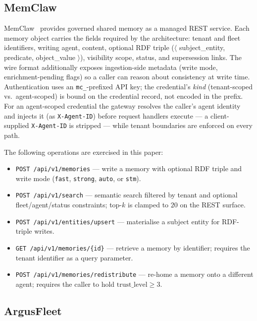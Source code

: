 \documentclass[10pt,twocolumn,letterpaper]{article}
\begin{document}
\subsection{MemClaw}

MemClaw~\citep{memclaw} provides governed shared memory as a managed REST service. Each memory object carries the fields required by the architecture: tenant and fleet identifiers, writing agent, content, optional RDF triple (\(\langle\) subject\_entity, predicate, object\_value \(\rangle\)), visibility scope, status, and supersession links. The wire format additionally exposes ingestion-side metadata (write mode, enrichment-pending flags) so a caller can reason about consistency at write time. Authentication uses an \texttt{mc\_}-prefixed API key; the credential's \emph{kind} (tenant-scoped vs.\ agent-scoped) is bound on the credential record, not encoded in the prefix. For an agent-scoped credential the gateway resolves the caller's agent identity and injects it (as \texttt{X-Agent-ID}) before request handlers execute --- a client-supplied \texttt{X-Agent-ID} is stripped --- while tenant boundaries are enforced on every path.

The following operations are exercised in this paper:
\begin{itemize}
    \item \texttt{POST /api/v1/memories} --- write a memory with optional RDF triple and write mode (\texttt{fast}, \texttt{strong}, \texttt{auto}, or \texttt{stm}).
    \item \texttt{POST /api/v1/search} --- semantic search filtered by tenant and optional fleet/agent/status constraints; top-\(k\) is clamped to \(20\) on the REST surface.
    \item \texttt{POST /api/v1/entities/upsert} --- materialise a subject entity for RDF-triple writes.
    \item \texttt{GET /api/v1/memories/\{id\}} --- retrieve a memory by identifier; requires the tenant identifier as a query parameter.
    \item \texttt{POST /api/v1/memories/redistribute} --- re-home a memory onto a different agent; requires the caller to hold \(\text{trust\_level} \ge 3\).
\end{itemize}

\subsection{ArgusFleet}
\end{document}
